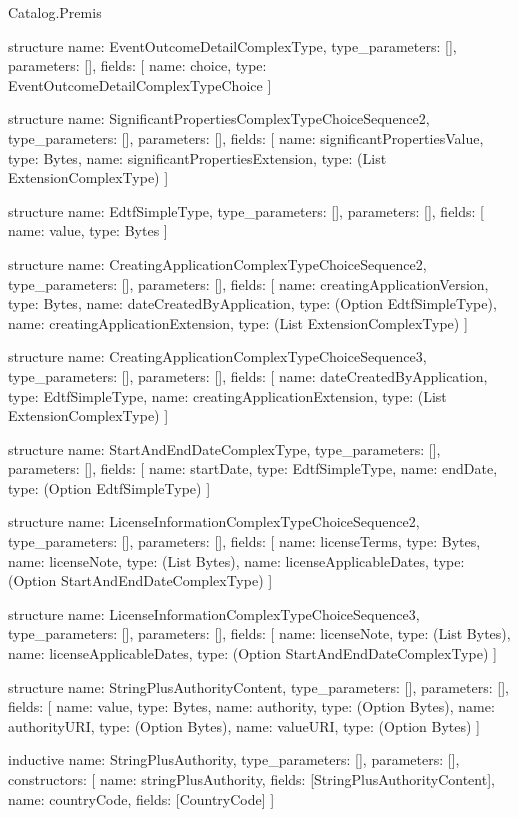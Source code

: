 \begin{lexlean}{Catalog.Premis}
\begin{semanticmodule}
structure{
  name: EventOutcomeDetailComplexType,
  type_parameters: [],
  parameters: [],
  fields: [
    {name: choice, type: EventOutcomeDetailComplexTypeChoice}
  ]
}

structure{
  name: SignificantPropertiesComplexTypeChoiceSequence2,
  type_parameters: [],
  parameters: [],
  fields: [
    {name: significantPropertiesValue, type: Bytes},
    {name: significantPropertiesExtension, type: (List ExtensionComplexType)}
  ]
}

structure{
  name: EdtfSimpleType,
  type_parameters: [],
  parameters: [],
  fields: [
    {name: value, type: Bytes}
  ]
}

structure{
  name: CreatingApplicationComplexTypeChoiceSequence2,
  type_parameters: [],
  parameters: [],
  fields: [
    {name: creatingApplicationVersion, type: Bytes},
    {name: dateCreatedByApplication, type: (Option EdtfSimpleType)},
    {name: creatingApplicationExtension, type: (List ExtensionComplexType)}
  ]
}

structure{
  name: CreatingApplicationComplexTypeChoiceSequence3,
  type_parameters: [],
  parameters: [],
  fields: [
    {name: dateCreatedByApplication, type: EdtfSimpleType},
    {name: creatingApplicationExtension, type: (List ExtensionComplexType)}
  ]
}

structure{
  name: StartAndEndDateComplexType,
  type_parameters: [],
  parameters: [],
  fields: [
    {name: startDate, type: EdtfSimpleType},
    {name: endDate, type: (Option EdtfSimpleType)}
  ]
}

structure{
  name: LicenseInformationComplexTypeChoiceSequence2,
  type_parameters: [],
  parameters: [],
  fields: [
    {name: licenseTerms, type: Bytes},
    {name: licenseNote, type: (List Bytes)},
    {name: licenseApplicableDates, type: (Option StartAndEndDateComplexType)}
  ]
}

structure{
  name: LicenseInformationComplexTypeChoiceSequence3,
  type_parameters: [],
  parameters: [],
  fields: [
    {name: licenseNote, type: (List Bytes)},
    {name: licenseApplicableDates, type: (Option StartAndEndDateComplexType)}
  ]
}

structure{
  name: StringPlusAuthorityContent,
  type_parameters: [],
  parameters: [],
  fields: [
    {name: value, type: Bytes},
    {name: authority, type: (Option Bytes)},
    {name: authorityURI, type: (Option Bytes)},
    {name: valueURI, type: (Option Bytes)}
  ]
}

inductive{
  name: StringPlusAuthority,
  type_parameters: [],
  parameters: [],
  constructors: [
    {name: stringPlusAuthority, fields: [StringPlusAuthorityContent]},
    {name: countryCode, fields: [CountryCode]}
  ]
}


\end{semanticmodule}
\end{lexlean}
